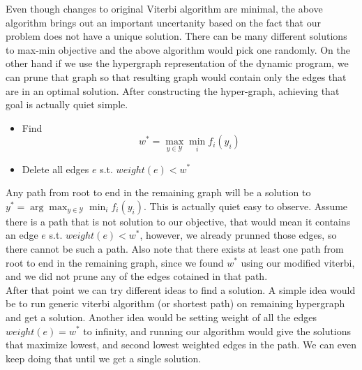 \documentclass{article}
\begin{document}
Even though changes to original Viterbi algorithm are minimal, the above
algorithm brings out an important uncertanity based on the fact that our problem
does not have a unique solution. There can be many different solutions to
max-min objective and the above algorithm would pick one randomly. On the other
hand if we use the hypergraph representation of the dynamic program, we can
prune that graph so that resulting graph would contain only the edges that are
in an optimal solution. After constructing the hyper-graph, achieving that goal
is actually quiet simple. 
\begin{itemize}
  \item Find \[w^* = \max_{y\in\mathcal{Y}} \min_i f_i(y_i)\]
  \item Delete all edges $e$ s.t. $weight(e)< w^* $
\end{itemize}
Any path from root to end in the remaining graph will be a solution to $y^* =
\arg\max_{y\in\mathcal{Y}} \min_i f_i(y_i)$. This is actually quiet easy to
observe. Assume there is a path that is not solution to our objective, that
would mean it contains an edge $e$ s.t. $weight(e)< w^* $, however, we already
prunned those edges, so there cannot be such a path. Also note that there exists
at least one path from root to end in the remaining graph, since we found $w^*$
using our modified viterbi, and we did not prune any of the edges cotained in
that path.\\

After that point we can try different ideas to find a solution. A simple idea
would be to run generic viterbi algorithm (or shortest path) on remaining
hypergraph and get a solution. Another idea would be setting weight of all the
edges $weight(e)=w^*$ to infinity, and running our algorithm would give the
solutions that maximize lowest, and second lowest weighted edges in the path. We
can even keep doing that until we get a single solution.
\end{document}

